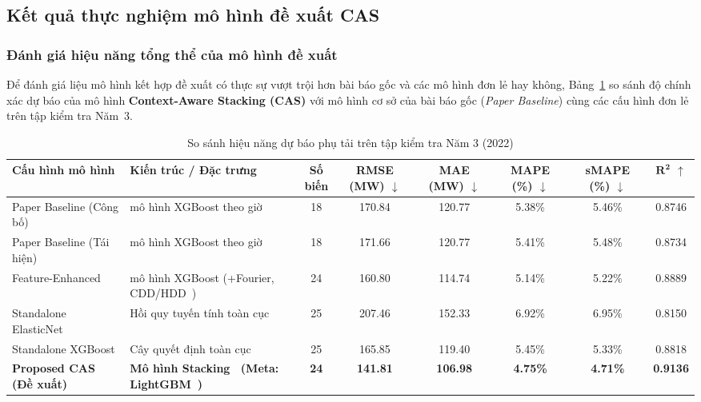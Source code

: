 \subsection{Kết quả thực nghiệm mô hình đề xuất CAS}
\label{sec:experimental_results}

\subsubsection{Đánh giá hiệu năng tổng thể của mô hình đề xuất}

Để đánh giá liệu mô hình kết hợp đề xuất có thực sự vượt trội hơn bài báo gốc và các mô hình đơn lẻ hay không, Bảng~\ref{tab:master_comparison} so sánh độ chính xác dự báo của mô hình \textbf{Context-Aware Stacking (CAS)} với mô hình cơ sở của bài báo gốc (\textit{Paper Baseline}) cùng các cấu hình đơn lẻ trên tập kiểm tra Năm~3.

\begin{table}[H]
\centering
\footnotesize
{}
\caption{So sánh hiệu năng dự báo phụ tải trên tập kiểm tra Năm 3 (2022)}
\label{tab:master_comparison}
\setlength{\tabcolsep}{3.0pt}
\renewcommand{\arraystretch}{1.15}
\begin{tabularx}{\linewidth}{@{} l >{\RaggedRight\arraybackslash}X c c c c c c @{}}
\toprule
\textbf{Cấu hình mô hình} & \textbf{Kiến trúc / Đặc trưng} & \makecell{\textbf{Số}\\\textbf{biến}} & \makecell{\textbf{RMSE}\\\textbf{(MW)} $\downarrow$} & \makecell{\textbf{MAE}\\\textbf{(MW)} $\downarrow$} & \makecell{\textbf{MAPE}\\\textbf{(\%)} $\downarrow$} & \makecell{\textbf{sMAPE}\\\textbf{(\%)} $\downarrow$} & $\mathbf{R^2}$ $\uparrow$ \\
\midrule
Paper Baseline (Công bố)~\cite{roy2025hourly} & 24 mô hình XGBoost theo giờ & 18 & 170.84 & 120.77 & 5.38\% & 5.46\% & 0.8746 \\
Paper Baseline (Tái hiện) & 24 mô hình XGBoost theo giờ & 18 & 171.66 & 120.77 & 5.41\% & 5.48\% & 0.8734 \\
Feature-Enhanced & 24 mô hình XGBoost (+Fourier, CDD/HDD~\cite{quayle1980heating}) & 24 & 160.80 & 114.74 & 5.14\% & 5.22\% & 0.8889 \\
Standalone ElasticNet & Hồi quy tuyến tính toàn cục~\cite{zou2005regularization} & 25 & 207.46 & 152.33 & 6.92\% & 6.95\% & 0.8150 \\
Standalone XGBoost & Cây quyết định toàn cục~\cite{chen2016xgboost} & 25 & 165.85 & 119.40 & 5.45\% & 5.33\% & 0.8818 \\
\midrule
\textbf{Proposed CAS (Đề xuất)} & \textbf{Mô hình Stacking~\cite{wolpert1992stacked} (Meta: LightGBM~\cite{ke2017lightgbm})} & \textbf{24} & \textbf{141.81} & \textbf{106.98} & \textbf{4.75\%} & \textbf{4.71\%} & \textbf{0.9136} \\
\bottomrule
\end{tabularx}
\end{table}

